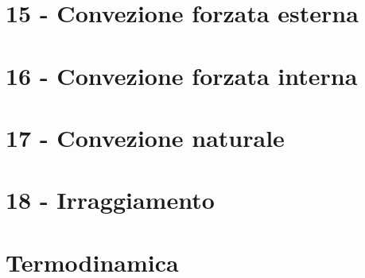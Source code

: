 \documentclass[11pt,a4paper]{book}
\begin{document}
\chapter{15 - Convezione forzata esterna}


\chapter{16 - Convezione forzata interna}


\chapter{17 - Convezione naturale}


\chapter{18 - Irraggiamento}


\chapter{Termodinamica}

\end{document}
